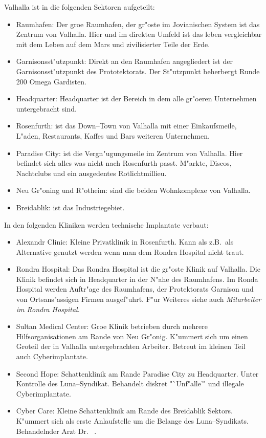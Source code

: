 Valhalla ist in die folgenden Sektoren aufgeteilt:

\begin{itemize}
    \item Raumhafen: Der gro\3e Raumhafen, der gr"oste im Jovianischen System ist das Zentrum von Valhalla. Hier und im direkten Umfeld ist das leben vergleichbar mit dem Leben auf dem Mars und zivilisierter Teile der Erde.
    \item Garnisonsst"utzpunkt: Direkt an den Raumhafen angegliedert ist der Garnisonsst"utzpunkt des Prototektorats. Der St"utzpunkt beherbergt Runde 200 Omega Gardisten. 
    \item Headquarter: Headquarter ist der Bereich in dem alle gr"o\3eren Unternehmen untergebracht sind.
    \item Rosenfurth: ist das Down--Town  von Valhalla mit einer Einkaufsmeile, L"aden, Restaurants, Kaffes und Bars weiteren Unternehmen.
    \item Paradise City: ist die Vergn"ugungsmeile im Zentrum von Valhalla. Hier befindet sich alles was nicht nach Rosenfurth passt. M"arkte, Discos, Nachtclubs und ein ausgedentes Rotlichtmillieu.
    \item Neu Gr"oning und R"otheim: sind die beiden Wohnkomplexe von Valhalla.
    \item Breidablik: ist das Industriegebiet.
\end{itemize}


In den folgenden Kliniken werden technische Implantate verbaut:

\begin{itemize}
    \item Alexandr Clinic: Kleine Privatklinik in Rosenfurth. Kann als z.B.~als Alternative genutzt werden wenn man dem Rondra Hospital nicht traut.
    \item Rondra Hospital: Das Rondra Hospital ist die gr"os\3te Klinik auf Valhalla. Die Klinik befindet sich in Headquarter in der N"ahe des Raumhafens. Im Ronda Hospital werden Auftr"age des Raumhafens, der Protektorats Garnison und von Ortsans"assigen Firmen ausgef"uhrt. F"ur Weiteres siehe auch \emph{Mitarbeiter im Rondra Hospital}. 
    \item Sultan Medical Center: Gro\3e Klinik betrieben durch mehrere Hilfsorganisationen am Rande von Neu Gr"onig. K"ummert sich um einen Gro\3teil der in Valhalla untergebrachten Arbeiter. Betreut im kleinen Teil auch Cyberimplantate.
    \item Second Hope: Schattenklinik am Rande Paradise City zu Headquarter. Unter Kontrolle des Luna--Syndikat. Behandelt diskret "`Unf"alle'" und illegale Cyberimplantate.
    \item {} Cyber Care: Kleine Schattenklinik am Rande des Breidablik Sektors. K"ummert sich als erste Anlaufstelle um die Belange des Luna--Syndikats. Behandelnder Arzt Dr.~ .
\end{itemize}

